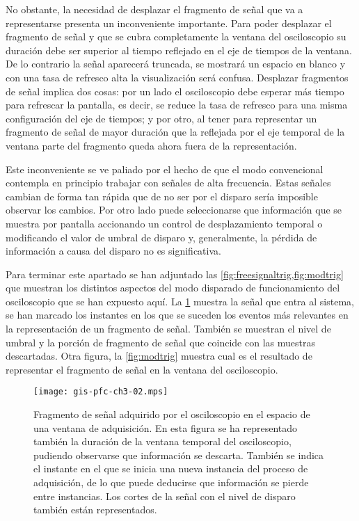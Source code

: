 No obstante, la necesidad de desplazar el fragmento de señal que va a representarse presenta un inconveniente importante. Para poder desplazar el fragmento de señal y que se cubra completamente la ventana del osciloscopio su duración debe ser superior al tiempo reflejado en el eje de tiempos de la ventana. De lo contrario la señal aparecerá truncada, se mostrará un espacio en blanco y con una tasa de refresco alta la visualización será confusa. Desplazar fragmentos de señal implica dos cosas: por un lado el osciloscopio debe esperar más tiempo para refrescar la pantalla, es decir, se reduce la tasa de refresco para una misma configuración del eje de tiempos; y por otro, al tener para representar un fragmento de señal de mayor duración que la reflejada por el eje temporal de la ventana parte del fragmento queda ahora fuera de la representación.\par
Este inconveniente se ve paliado por el hecho de que el modo convencional contempla en principio trabajar con señales de alta frecuencia. Estas señales cambian de forma tan rápida que de no ser por el disparo sería imposible observar los cambios. Por otro lado puede seleccionarse que información que se muestra por pantalla accionando un control de desplazamiento temporal o modificando el valor de umbral de disparo y, generalmente, la pérdida de información a causa del disparo no es significativa.\par
Para terminar este apartado se han adjuntado las \cref{fig:freesignaltrig,fig:modtrig} que muestran los distintos aspectos del modo disparado de funcionamiento del osciloscopio que se han expuesto aquí. La \cref{fig:freesignaltrig} muestra la señal que entra al sistema, se han marcado los instantes en los que se suceden los eventos más relevantes en la representación de un fragmento de señal. También se muestran el nivel de umbral y la porción de fragmento de señal que coincide con las muestras descartadas. Otra figura, la \cref{fig:modtrig} muestra cual es el resultado de representar el fragmento de señal en la ventana del osciloscopio.

\begin{figure}
	\begin{center}
		\texttt{[image: gis-pfc-ch3-02.mps]}
	\end{center}
	\caption[Fragmento de señal adquirido por el osciloscopio en el espacio de una ventana de adquisición]{Fragmento de señal adquirido por el osciloscopio en el espacio de una ventana de adquisición. En esta figura se ha representado también la duración de la ventana temporal del osciloscopio, pudiendo observarse que información se descarta. También se indica el instante en el que se inicia una nueva instancia del proceso de adquisición, de lo que puede deducirse que información se pierde entre instancias. Los cortes de la señal con el nivel de disparo también están representados.}
	\label{fig:freesignaltrig}
\end{figure}

